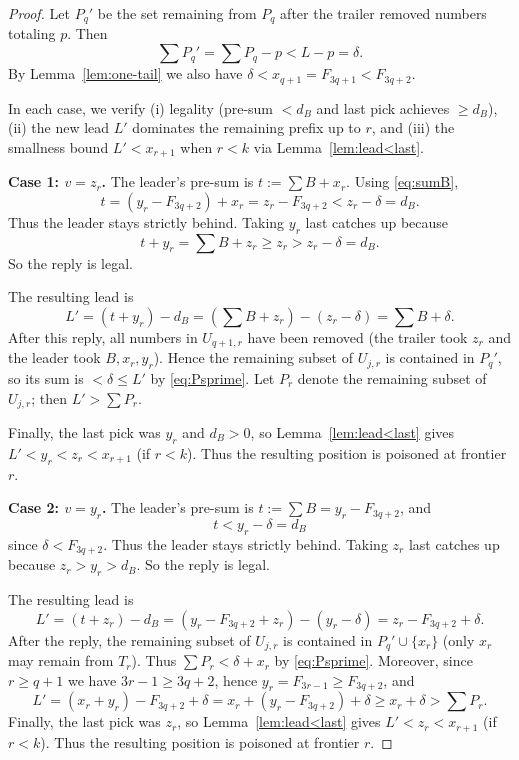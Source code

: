 \documentclass[11pt]{article}
\begin{document}
\begin{proof}
Let $P_q'$ be the set remaining from $P_q$ after the trailer removed numbers totaling $p$.
Then
\begin{equation}\label{eq:Psprime}
\sum P_q'=\sum P_q-p < L-p=\delta.
\end{equation}
By Lemma~\ref{lem:one-tail} we also have $\delta<x_{q+1}=F_{3q+1}<F_{3q+2}$.

In each case, we verify (i) legality (pre-sum $<d_B$ and last pick achieves $\ge d_B$), (ii) the new lead $L'$ dominates the remaining
prefix up to $r$, and (iii) the smallness bound $L'<x_{r+1}$ when $r<k$ via Lemma~\ref{lem:lead<last}.

\medskip\noindent
\textbf{Case 1: $v=z_r$.}
The leader's pre-sum is $t:=\sum B+x_r$.
Using \eqref{eq:sumB},
\[
t=(y_r-F_{3q+2})+x_r=z_r-F_{3q+2}<z_r-\delta=d_B.
\]
Thus the leader stays strictly behind. Taking $y_r$ last catches up because
\[
t+y_r=\sum B+z_r \ge z_r > z_r-\delta=d_B.
\]
So the reply is legal.

The resulting lead is
\[
L'=(t+y_r)-d_B=(\sum B+z_r)-(z_r-\delta)=\sum B+\delta.
\]
After this reply, all numbers in $U_{q+1,r}$ have been removed (the trailer took $z_r$ and the leader took $B,x_r,y_r$).
Hence the remaining subset of $U_{j,r}$ is contained in $P_q'$, so its sum is $<\delta\le L'$ by \eqref{eq:Psprime}.
Let $P_r$ denote the remaining subset of $U_{j,r}$; then $L'>\sum P_r$.

Finally, the last pick was $y_r$ and $d_B>0$, so Lemma~\ref{lem:lead<last} gives $L'<y_r<z_r<x_{r+1}$ (if $r<k$).
Thus the resulting position is poisoned at frontier $r$.

\medskip\noindent
\textbf{Case 2: $v=y_r$.}
The leader's pre-sum is $t:=\sum B=y_r-F_{3q+2}$, and
\[
t<y_r-\delta=d_B
\]
since $\delta<F_{3q+2}$. Thus the leader stays strictly behind. Taking $z_r$ last catches up because $z_r>y_r>d_B$.
So the reply is legal.

The resulting lead is
\[
L'=(t+z_r)-d_B=(y_r-F_{3q+2}+z_r)-(y_r-\delta)=z_r-F_{3q+2}+\delta.
\]
After the reply, the remaining subset of $U_{j,r}$ is contained in $P_q'\cup\{x_r\}$ (only $x_r$ may remain from $T_r$).
Thus $\sum P_r<\delta+x_r$ by \eqref{eq:Psprime}. Moreover, since $r\ge q+1$ we have $3r-1\ge 3q+2$, hence $y_r=F_{3r-1}\ge F_{3q+2}$, and
\[
L'=(x_r+y_r)-F_{3q+2}+\delta = x_r+(y_r-F_{3q+2})+\delta \ge x_r+\delta>\sum P_r.
\]
Finally, the last pick was $z_r$, so Lemma~\ref{lem:lead<last} gives $L'<z_r<x_{r+1}$ (if $r<k$).
Thus the resulting position is poisoned at frontier $r$.


\end{proof}
\end{document}
